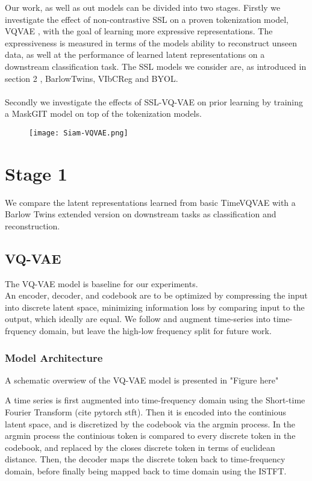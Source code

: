 \documentclass[../../thesis.tex]{subfiles}
\begin{document}
Our work, as well as out models can be divided into two stages. Firstly we investigate the effect of non-contrastive SSL on a proven tokenization model, VQVAE \cite{VQVAE}, with the goal of learning more expressive representations. The expressiveness is measured in terms of the models ability to reconstruct unseen data, as well at the performance of learned latent representations on a downstream classification task. The SSL models we consider are, as introduced in section 2 , BarlowTwins, VIbCReg and BYOL.\\\\

Secondly we investigate the effects of SSL-VQ-VAE on prior learning by training a MaskGIT model on top of the tokenization models.


\begin{figure}[h]
    \texttt{[image: Siam-VQVAE.png]}
    \centering    
\end{figure}


\section{Stage 1}
We compare the latent representations learned from basic TimeVQVAE with a Barlow Twins extended version on downstream tasks as classification and reconstruction.



\subsection{VQ-VAE}
The VQ-VAE model is baseline for our experiments.\\

An encoder, decoder, and codebook are to be optimized by compressing the input into discrete latent space, minimizing information loss by comparing input to the output, which ideally are equal. We follow \cite{TimeVQVAE} and augment time-series into time-frquency domain, but leave the high-low frequency split for future work. \\

\subsubsection{Model Architecture}
A schematic overwiew of the VQ-VAE model is presented in "Figure here"

A time series is first augmented into time-frequency domain using the Short-time Fourier Transform (cite pytorch stft). Then it is encoded into the continious latent space, and is discretized by the codebook via the argmin process. In the argmin process the continious token is compared to every discrete token in the codebook, and replaced by the closes discrete token in terms of euclidean distance. Then, the decoder maps the discrete token back to time-frequency domain, before finally being mapped back to time domain using the ISTFT.
\end{document}
